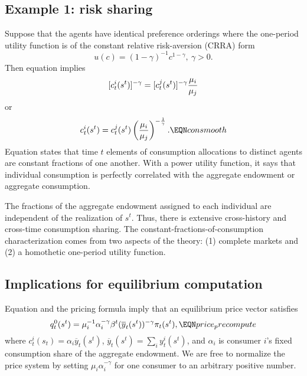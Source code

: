 \subsection{Example 1: risk sharing}\label{sec:ex1_risksharing}%
\noindent Suppose that the agents have identical preference orderings where
the one-period utility function is of the constant
relative risk-aversion (CRRA) form
$$ u(c) = (1-\gamma)^{-1} c^{1-\gamma} , \ \gamma > 0.$$
Then equation  implies
$$ [c_t^i(s^t)]^{-\gamma}
   = [c_t^j(s^t)]^{-\gamma} {\mu_i \over \mu_j} $$
or
$$ c_t^i(s^t) = c_t^j(s^t) \left({\mu_i \over \mu_j}\right)^{-{1 \over  \gamma}}.
    \EQN consmooth $$
Equation  states that time $t$ elements
of consumption allocations  to
distinct agents are
constant fractions of one another. With a power utility function,
 it says that  individual
consumption is perfectly correlated with the aggregate endowment
or aggregate consumption.   

The fractions  of the aggregate endowment assigned to each
individual are independent of the realization of $s^t$.    Thus,
there is extensive cross-history and cross-time consumption
sharing. The constant-fractions-of-consumption characterization
comes from two aspects of the theory: (1) complete markets
and (2) a  homothetic one-period utility function.


\subsection{Implications for equilibrium computation}\label{sec:compeasy}%
\noindent Equation  and the pricing formula
 imply that an equilibrium price vector satisfies
$$ q_t^0(s^t) = \mu_i^{-1} \alpha_i^{-\gamma} \beta^t (\overline y_t(s^t))^{-\gamma} \pi_t(s^t) , \EQN price_precompute$$
where $c_t^i(s_t) = \alpha_i \overline y_t(s^t)$, $\overline y_t(s^t) = \sum_i y_t^i(s^t)$, and $\alpha_i$ is consumer $i$'s
fixed consumption share of the aggregate endowment.
We are free to normalize the price system by setting $\mu_i \alpha_i^{-\gamma}$ for one consumer to an arbitrary positive number.

